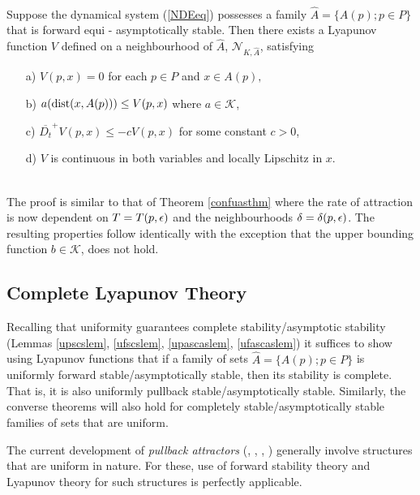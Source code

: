 \begin{therm} \hfill \\
\label{confasthm} Suppose the dynamical system (\ref{NDEeq})
possesses a family $\hat{A} = \{A(p) ; p \in P \}$ that is forward
equi - asymptotically stable. Then there exists a Lyapunov
function $V$ defined on a neighbourhood of $\hat{A}$, $\mathcal{N}_{K,\hat{A}}$,
satisfying
\begin{itemize}
  \item[a)] $V(p, x) = 0$ for each $p \in P$ and $x \in A(p),$
  \item[b)] $a({\rm dist}( x, A(p))) \leq V(p, x)$
    where $a\in \mathcal{K}$,
  \item[c)] $\overline{D_t}^+ V(p, x) \leq -cV(p, x)$ for some constant $c >
    0$,
  \item[d)] $V$ is continuous in both variables and locally Lipschitz in
    $x$.
\end{itemize}
\end{therm}
\begin{prf} \hfill \\
The proof is similar to that of Theorem \ref{confuasthm}
where the rate of attraction is now dependent on $T=T(p, \epsilon)$ and
the neighbourhoods $\delta = \delta(p, \epsilon)$. The resulting
properties follow identically with the exception that the upper
bounding function $b \in \mathcal{K}$, does not hold.
\end{prf}

\subsection{Complete Lyapunov Theory}
\label{CLiapssec}

Recalling that uniformity guarantees complete stability/asymptotic
stability (Lemmas \ref{upscslem}, \ref{ufscslem},
\ref{upascaslem}, \ref{ufascaslem}) it suffices to show using
Lyapunov functions that if a family of sets $\hat{A} = \{A(p); p
\in P\}$ is uniformly forward stable/asymptotically stable, then
its stability is complete. That is, it is also uniformly pullback
stable/asymptotically stable. Similarly, the converse theorems
will also hold for completely stable/asymptotically stable
families of sets that are uniform.

The current development of \textit{pullback attractors} (\cite{CrFl94},
\cite{FlSc96}, \cite{FS95}, \cite{Kl98}) generally involve structures that are
uniform in nature. For these, use of forward stability theory and Lyapunov
theory for such structures is perfectly applicable.

